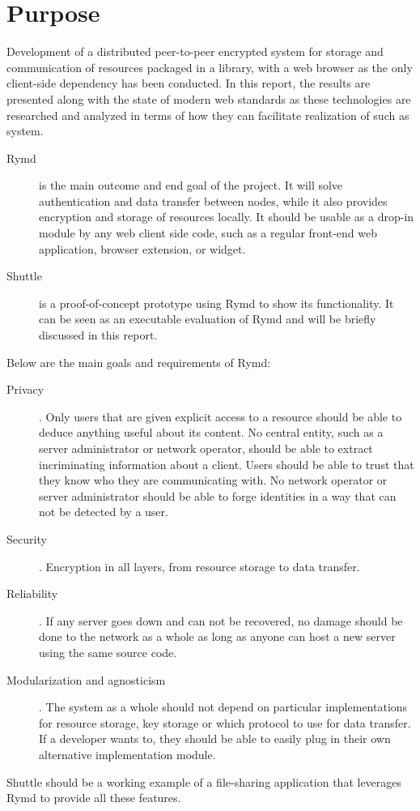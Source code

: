\section{Purpose}\label{sec:purpose}

Development of a distributed peer-to-peer encrypted system for storage and communication of resources packaged in a library, with a web browser as the only client-side dependency has been conducted. In this report, the results are presented along with the state of modern web standards as these technologies are researched and analyzed in terms of how they can facilitate realization of such as system.

\begin{description}
\item[Rymd] is the main outcome and end goal of the project. It will solve authentication and data transfer between nodes, while it also provides encryption and storage of resources locally. It should be usable as a drop-in module by any web client side code, such as a regular front-end web application, browser extension, or widget.
\item[Shuttle] is a proof-of-concept prototype using Rymd to show its functionality. It can be seen as an executable evaluation of Rymd and will be briefly discussed in this report.
\end{description}

Below are the main goals and requirements of Rymd:

\begin{description}
  \item[Privacy]. Only users that are given explicit access to a resource should be able to deduce anything useful about its content. No central entity, such as a server administrator or network operator, should be able to extract incriminating information about a client. Users should be able to trust that they know who they are communicating with. No network operator or server administrator should be able to forge identities in a way that can not be detected by a user.

\item[Security]. Encryption in all layers, from resource storage to data transfer.

\item[Reliability]. If any server goes down and can not be recovered, no damage should be done to the network as a whole as long as anyone can host a new server using the same source code.

\item[Modularization and agnosticism]. The system as a whole should not depend on particular implementations for resource storage, key storage or which protocol to use for data transfer. If a developer wants to, they should be able to easily plug in their own alternative implementation module.

\end{description}

Shuttle should be a working example of a file-sharing application that leverages Rymd to provide all these features.
